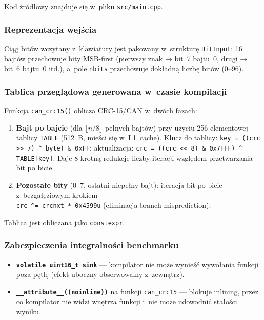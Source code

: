 \documentclass[12pt,a4paper]{article}
\begin{document}
Kod źródłowy znajduje się w~pliku \texttt{src/main.cpp}.

\subsubsection*{Reprezentacja wejścia}

Ciąg bitów wczytany z~klawiatury jest pakowany w~strukturę \texttt{BitInput}:
16 bajtów przechowuje bity MSB-first (pierwszy znak → bit~7 bajtu~0,
drugi → bit~6 bajtu~0 itd.), a~pole \texttt{nbits} przechowuje dokładną
liczbę bitów (0–96).

\subsubsection*{Tablica przeglądowa generowana w~czasie kompilacji}

Funkcja \texttt{can\_crc15()} oblicza CRC-15/CAN w~dwóch fazach:

\begin{enumerate}[label=\arabic*.]
    \item \textbf{Bajt po bajcie} (dla $\lfloor n/8 \rfloor$ pełnych bajtów)
          przy użyciu 256-elementowej tablicy \texttt{TABLE} (512~B, mieści się
          w~L1~cache). Klucz do tablicy: \texttt{key = ((crc >> 7) \^{} byte) \& 0xFF};
          aktualizacja: \texttt{crc = ((crc << 8) \& 0x7FFF) \^{} TABLE[key]}.
          Daje 8-krotną redukcję liczby iteracji względem przetwarzania
          bit po bicie.
    \item \textbf{Pozostałe bity} (0–7, ostatni niepełny bajt): iteracja
          bit po bicie z~bezgałęziowym krokiem \\
          \texttt{crc \^{}= crcnxt * 0x4599u} (eliminacja branch misprediction).
\end{enumerate}

Tablica jest obliczana jako \texttt{constexpr}.

\subsubsection*{Zabezpieczenia integralności benchmarku}

\begin{itemize}
    \item \textbf{\texttt{volatile uint16\_t sink}} — kompilator nie może
          wynieść wywołania funkcji poza pętlę (efekt uboczny obserwowalny
          z~zewnątrz).
    \item \textbf{\texttt{\_\_attribute\_\_((noinline))}} na funkcji
          \texttt{can\_crc15} — blokuje inlining, przez co kompilator nie
          widzi wnętrza funkcji i~nie może udowodnić stałości wyniku.
\end{itemize}
\end{document}
